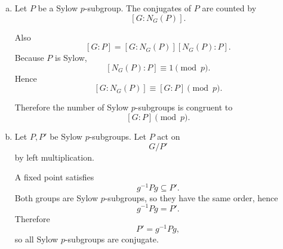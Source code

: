 \documentclass[12pt]{article}
\begin{document}
\begin{enumerate}[(a)]
\item Let $P$ be a Sylow $p$-subgroup. The conjugates of $P$ are counted by
\[
[G:N_G(P)].
\]

Also
\[
[G:P]=[G:N_G(P)][N_G(P):P].
\]
Because $P$ is Sylow,
\[
[N_G(P):P]\equiv1\pmod p.
\]
Hence
\[
[G:N_G(P)]\equiv[G:P]\pmod p.
\]

Therefore the number of Sylow $p$-subgroups is congruent to
\[
[G:P]\pmod p.
\]

\item Let $P,P'$ be Sylow $p$-subgroups. Let $P$ act on
\[
G/P'
\]
by left multiplication.

A fixed point satisfies
\[
g^{-1}Pg\subseteq P'.
\]
Both groups are Sylow $p$-subgroups, so they have the same order, hence
\[
g^{-1}Pg=P'.
\]
Therefore
\[
P'=g^{-1}Pg,
\]
so all Sylow $p$-subgroups are conjugate.

\end{enumerate}
\end{document}
